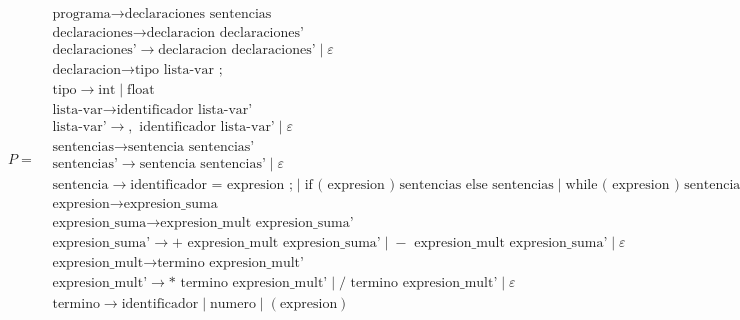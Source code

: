 \documentclass{article}
\begin{document}
\[
P =
\begin{aligned}
& \text{programa} \to \text{declaraciones sentencias} \\
& \text{declaraciones} \to \text{declaracion declaraciones'} \\
& \text{declaraciones'} \to \text{declaracion declaraciones'} \;|\; \varepsilon \\
& \text{declaracion} \to \text{tipo lista-var ;} \\
& \text{tipo} \to \text{int} \;|\; \text{float} \\
& \text{lista-var} \to \text{identificador lista-var'} \\
& \text{lista-var'} \to , \text{ identificador lista-var'} \;|\; \varepsilon \\
& \text{sentencias} \to \text{sentencia sentencias'} \\
& \text{sentencias'} \to \text{sentencia sentencias'} \;|\; \varepsilon \\
& \text{sentencia} \to \text{identificador = expresion ;} \;|\; \text{if ( expresion ) sentencias else sentencias} \;|\; \text{while ( expresion ) sentencias} \\
& \text{expresion} \to \text{expresion\_suma} \\
& \text{expresion\_suma} \to \text{expresion\_mult expresion\_suma'} \\
& \text{expresion\_suma'} \to + \text{ expresion\_mult expresion\_suma'} \;|\; - \text{ expresion\_mult expresion\_suma'} \;|\; \varepsilon \\
& \text{expresion\_mult} \to \text{termino expresion\_mult'} \\
& \text{expresion\_mult'} \to * \text{ termino expresion\_mult'} \;|\; / \text{ termino expresion\_mult'} \;|\; \varepsilon \\
& \text{termino} \to \text{identificador} \;|\; \text{numero} \;|\; ( \text{expresion} )
\end{aligned}
\]
\end{document}
